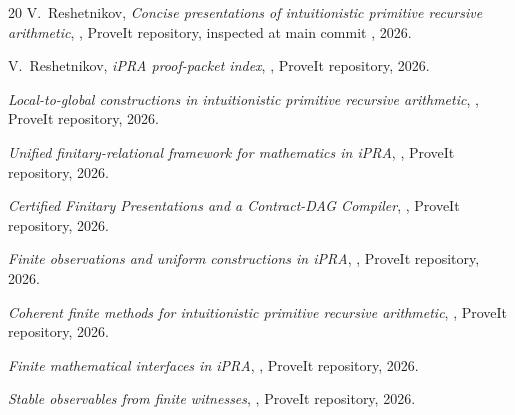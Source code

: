 \documentclass[11pt,oneside]{article}
\theoremstyle{definition}
\begin{document}
\begin{thebibliography}{20}
V.~Reshetnikov, \emph{Concise presentations of intuitionistic primitive recursive arithmetic},
, ProveIt repository, inspected at main commit
, 2026.

V.~Reshetnikov, \emph{iPRA proof-packet index},
, ProveIt repository, 2026.

\emph{Local-to-global constructions in intuitionistic primitive recursive arithmetic},
, ProveIt repository, 2026.

\emph{Unified finitary-relational framework for mathematics in iPRA},
, ProveIt repository, 2026.

\emph{Certified Finitary Presentations and a Contract-DAG Compiler},
, ProveIt repository, 2026.

\emph{Finite observations and uniform constructions in iPRA},
, ProveIt repository, 2026.

\emph{Coherent finite methods for intuitionistic primitive recursive arithmetic},
, ProveIt repository, 2026.

\emph{Finite mathematical interfaces in iPRA},
, ProveIt repository, 2026.

\emph{Stable observables from finite witnesses},
, ProveIt repository, 2026.
\end{thebibliography}
\end{document}
